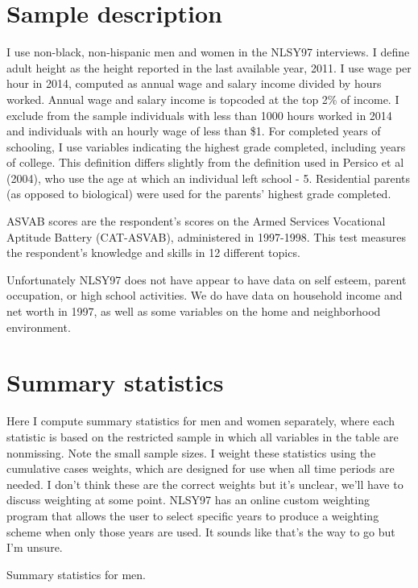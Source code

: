 \documentclass{article}
\begin{document}
\tableofcontents
\newpage

\section{Sample description}
I use non-black, non-hispanic men and women in the NLSY97 interviews. I define adult height as the height reported in the last available year, 2011. I use wage per hour in 2014, computed as annual wage and salary income divided by hours worked. Annual wage and salary income is topcoded at the top 2\% of income. I exclude from the sample individuals with less than 1000 hours worked in 2014 and individuals with an hourly wage of less than \$1. 
For completed years of schooling, I use variables indicating the highest grade completed, including years of college. This definition differs slightly from the definition used in Persico et al (2004), who use the age at which an individual left school - 5. Residential parents (as opposed to biological) were used for the parents' highest grade completed.

ASVAB scores are the respondent's scores on the Armed Services Vocational Aptitude Battery (CAT-ASVAB), administered in 1997-1998. This test measures the respondent's knowledge and skills in 12 different topics.

Unfortunately NLSY97 does not have appear to have data on self esteem, parent occupation, or high school activities. We do have data on household income and net worth in 1997, as well as some variables on the home and neighborhood environment.

\section{Summary statistics}
Here I compute summary statistics for men and women separately, where each statistic is based on the restricted sample in which all variables in the table are nonmissing. Note the small sample sizes. I weight these statistics using the cumulative cases weights, which are designed for use when all time periods are needed. I don't think these are the correct weights but it's unclear, we'll have to discuss weighting at some point. NLSY97 has an online custom weighting program that allows the user to select specific years to produce a weighting scheme when only those years are used. It sounds like that's the way to go but I'm unsure.

\begin{table}[h]
\label{tab:summary_men}
\caption{Summary statistics for men.}

\end{table}
\end{document}
